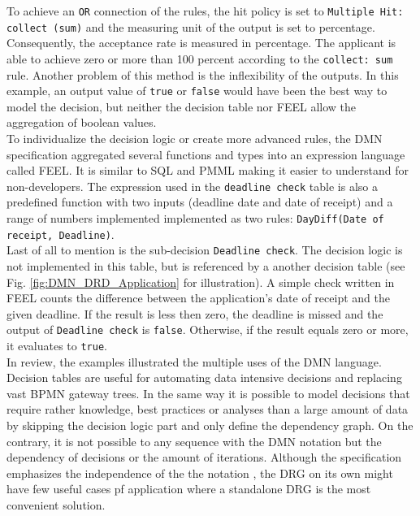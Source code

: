 To achieve an \texttt{OR} connection of the rules, the hit policy  is set to \texttt{Multiple Hit: collect (sum)} and the measuring unit of the output is set to percentage. Consequently, the acceptance rate is measured in percentage. The applicant is able to achieve zero or more than 100 percent according to the \texttt{collect: sum} rule. Another problem of this method is the inflexibility of the outputs. In this example, an output value of \texttt{true} or \texttt{false} would have been the best way to model the decision, but neither the decision table nor \ac{FEEL} allow the aggregation of boolean values. \\
To individualize the decision logic or create more advanced rules, the DMN specification aggregated several functions and types into an expression language called \acl{FEEL}. It is similar to \ac{SQL} and \ac{PMML} making it easier to understand for non-developers. The expression used in the \texttt{deadline check} table is also a predefined function with two inputs (deadline date and date of receipt) and a range of numbers implemented implemented as two rules: \texttt{DayDiff(Date of receipt, Deadline)}. \\
Last of all to mention is the sub-decision \texttt{Deadline check}. The decision logic is not implemented in this table, but is referenced by a another decision table (see Fig. \ref{fig:DMN_DRD_Application} for illustration). A simple check written in \ac{FEEL} counts the difference between the application's date of receipt and the given deadline. If the result is less then zero, the deadline is missed and the output of \texttt{Deadline check} is \texttt{false}. Otherwise, if the result equals zero or more, it evaluates to \texttt{true}. \\

In review, the examples illustrated the multiple uses of the DMN language. Decision tables are useful for automating data intensive decisions and replacing vast BPMN gateway trees. In the same way it is possible to model decisions that require rather knowledge, best practices or analyses than a large amount of data by skipping the decision logic part and only define the dependency graph. 
On the contrary, it is not possible to any sequence with the DMN notation but the dependency of decisions or the amount of iterations. Although the specification emphasizes the independence of the the notation \cite{DMNspec2016}, the \ac{DRG} on its own might have few useful cases pf application where a standalone \ac{DRG} is the most convenient solution. \\

